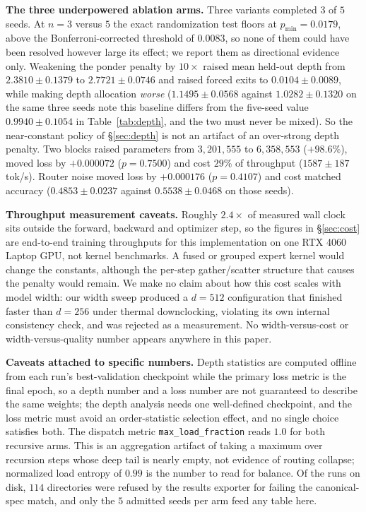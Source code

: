 \documentclass{article}
\begin{document}
\textbf{The three underpowered ablation arms.}
\label{app:threeseed}
Three variants completed $3$ of $5$ seeds. At $n = 3$ versus $5$ the exact
randomization test floors at $p_{\min} = 0.0179$, above the
Bonferroni-corrected threshold of $0.0083$, so none of them could have been
resolved however large its effect; we report them as directional evidence only.
Weakening the ponder penalty by $10\times$ raised mean held-out depth from
$2.3810 \pm 0.1379$ to $2.7721 \pm 0.0746$ and raised forced exits to
$0.0104 \pm 0.0089$, while making depth allocation \emph{worse}
($1.1495 \pm 0.0568$ against $1.0282 \pm 0.1320$ on the same three seeds 
note this baseline differs from the five-seed value $0.9940 \pm 0.1054$ in
Table~\ref{tab:depth}, and the two must never be mixed). So the near-constant
policy of \S\ref{sec:depth} is not an artifact of an over-strong depth penalty.
Two blocks raised parameters from $3{,}201{,}555$ to $6{,}358{,}553$
($+98.6\%$), moved loss by $+0.000072$ ($p = 0.7500$) and cost $29\%$ of
throughput ($1587 \pm 187$ tok/s). Router noise moved loss by $+0.000176$
($p = 0.4107$) and cost matched accuracy ($0.4853 \pm 0.0237$ against
$0.5538 \pm 0.0468$ on those seeds).

\textbf{Throughput measurement caveats.}
\label{app:cost}
Roughly $2.4\times$ of measured wall clock sits outside the forward, backward
and optimizer step, so the figures in \S\ref{sec:cost} are end-to-end training
throughputs for this implementation on one RTX 4060 Laptop GPU, not kernel
benchmarks. A fused or grouped expert kernel would change the constants,
although the per-step gather/scatter structure that causes the penalty would
remain. We make no claim about how this cost scales with model width: our width
sweep produced a $d = 512$ configuration that finished faster than $d = 256$
under thermal downclocking, violating its own internal consistency check, and
was rejected as a measurement. No width-versus-cost or width-versus-quality
number appears anywhere in this paper.

\textbf{Caveats attached to specific numbers.}
\label{app:caveats}
Depth statistics are computed offline from each run's best-validation
checkpoint while the primary loss metric is the final epoch, so a depth number
and a loss number are not guaranteed to describe the same weights; the depth
analysis needs one well-defined checkpoint, and the loss metric must avoid an
order-statistic selection effect, and no single choice satisfies both. The
dispatch metric \texttt{max\_load\_fraction} reads $1.0$ for both recursive
arms. This is an aggregation artifact of taking a maximum over recursion steps
whose deep tail is nearly empty, not evidence of routing collapse; normalized
load entropy of $0.99$ is the number to read for balance. Of the runs on disk,
$114$ directories were refused by the results exporter for failing the
canonical-spec match, and only the $5$ admitted seeds per arm feed any table
here.
\end{document}

